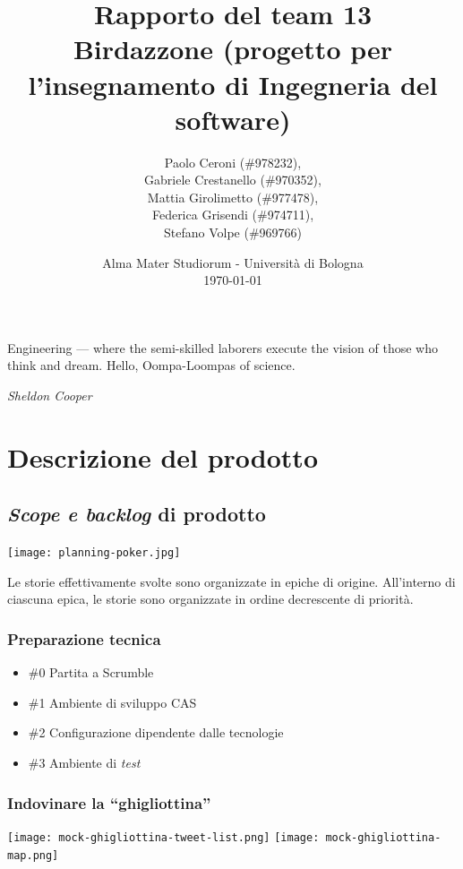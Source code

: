 \documentclass{article}
\title{
	\textbf{
		Rapporto del team 13 \\
	}
	\textbf{\large
		Birdazzone \break
		(progetto per l'insegnamento \break
		di Ingegneria del software)
	}
}
\author{
	Paolo Ceroni (\#978232), \\
	Gabriele Crestanello (\#970352), \\
	Mattia Girolimetto (\#977478), \\
	Federica Grisendi (\#974711), \\
	Stefano Volpe (\#969766)
}
\date{
	Alma Mater Studiorum - Universit\`a di Bologna \\
	\today
}
\begin{document}
\maketitle

\epigraph{
	Engineering --- where the semi-skilled laborers execute the vision of those
	who think and dream. Hello, Oompa-Loompas of science.
}{\textit{Sheldon Cooper}}

\thispagestyle{empty}
\pagebreak

\tableofcontents

\pagebreak

\section{Descrizione del prodotto}

\subsection{\emph{Scope e backlog} di prodotto}

\texttt{[image: planning-poker.jpg]}

Le storie effettivamente svolte sono organizzate in epiche di origine.
All'interno di ciascuna epica, le storie sono organizzate in ordine decrescente
di priorità.

\subsubsection{Preparazione tecnica}

\begin{itemize}
	\item \#0 Partita a Scrumble
	\item \#1 Ambiente di sviluppo CAS
	\item \#2 Configurazione dipendente dalle tecnologie
	\item \#3 Ambiente di \emph{test}
\end{itemize}

\subsubsection{Indovinare la ``ghigliottina''}

\texttt{[image: mock-ghigliottina-tweet-list.png]}
\texttt{[image: mock-ghigliottina-map.png]}
\end{document}
